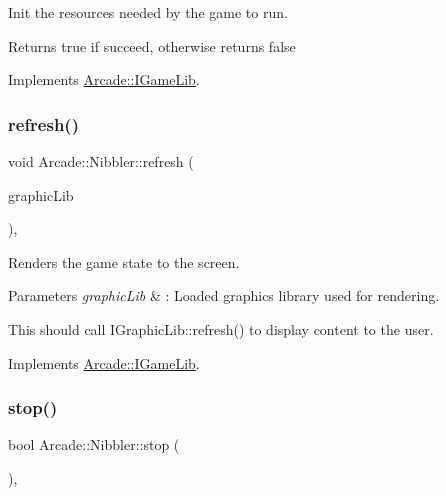 Init the resources needed by the game to run. 

\begin{DoxyReturn}{Returns}
true if succeed, otherwise returns false 
\end{DoxyReturn}


Implements \hyperlink{class_arcade_1_1_i_game_lib_aacc4169a98dfeb007bcaf9dfeece9e08}{Arcade\+::\+I\+Game\+Lib}.

\mbox{\label{class_arcade_1_1_nibbler_a69a64ec51964772a03cf7d4bb9088b5b}} 
\subsubsection{\texorpdfstring{refresh()}{refresh()}}
{\footnotesize\ttfamily void Arcade\+::\+Nibbler\+::refresh (\begin{DoxyParamCaption}\item[{\hyperlink{class_arcade_1_1_i_graphic_lib}{I\+Graphic\+Lib} \&}]{graphic\+Lib }\end{DoxyParamCaption})\hspace{0.3cm}{\ttfamily [final]}, {\ttfamily [virtual]}}

Renders the game state to the screen. 
\begin{DoxyParams}{Parameters}
{\em graphic\+Lib} & \+: Loaded graphics library used for rendering.\\
\hline
\end{DoxyParams}
This should call I\+Graphic\+Lib\+::refresh() to display content to the user. 

Implements \hyperlink{class_arcade_1_1_i_game_lib_a00c3d335ef313e441217b33dcf7844df}{Arcade\+::\+I\+Game\+Lib}.

\mbox{\label{class_arcade_1_1_nibbler_ab88c7e92e23e603b6bd1ccbb6c1ab844}} 
\subsubsection{\texorpdfstring{stop()}{stop()}}
{\footnotesize\ttfamily bool Arcade\+::\+Nibbler\+::stop (\begin{DoxyParamCaption}{ }\end{DoxyParamCaption})\hspace{0.3cm}{\ttfamily [final]}, {\ttfamily [virtual]}}



